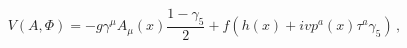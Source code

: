 \begin{equation}
V(A, \Phi) = -g\gamma^\mu A_\mu (x) \frac{1-\gamma_5}{2} + f\left(h(x)
+ i v p^a (x) \tau^a\gamma_5 \right) \, ,
\label{potential}
\end{equation}

